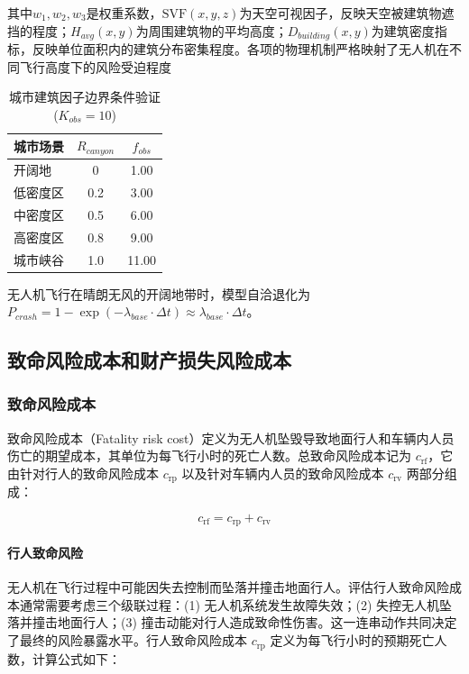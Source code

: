 其中$w_1, w_2, w_3$是权重系数，$\text{SVF}(x,y,z)$为天空可视因子，反映天空被建筑物遮挡的程度；$H_{avg}(x,y)$为周围建筑物的平均高度；$D_{building}(x,y)$为建筑密度指标，反映单位面积内的建筑分布密集程度。各项的物理机制严格映射了无人机在不同飞行高度下的风险受迫程度

\begin{table}[htbp]
\centering
\caption{城市建筑因子边界条件验证($K_{obs}=10$)}
\label{tab:urban_validation}
\renewcommand{\arraystretch}{1.3}
\begin{tabular}{l c c}
\toprule
\textbf{城市场景} & \textbf{$R_{canyon}$} & \textbf{$f_{obs}$} \\
\midrule
开阔地   & 0   & 1.00 \\
低密度区 & 0.2 & 3.00 \\
中密度区 & 0.5 & 6.00 \\
高密度区 & 0.8 & 9.00 \\
城市峡谷 & 1.0 & 11.00 \\
\bottomrule
\end{tabular}
\end{table}

无人机飞行在晴朗无风的开阔地带时，模型自洽退化为$P_{crash} = 1 - \exp(-\lambda_{base} \cdot \Delta t) \approx \lambda_{base} \cdot \Delta t$。

\subsection{致命风险成本和财产损失风险成本}

\subsubsection{致命风险成本}

致命风险成本（Fatality risk cost）定义为无人机坠毁导致地面行人和车辆内人员伤亡的期望成本，其单位为每飞行小时的死亡人数。总致命风险成本记为 $c_{\mathrm{rf}}$，它由针对行人的致命风险成本 $c_{\mathrm{rp}}$ 以及针对车辆内人员的致命风险成本 $c_{\mathrm{rv}}$ 两部分组成：

\begin{equation}
c_{\mathrm{rf}} = c_{\mathrm{rp}} + c_{\mathrm{rv}}
\label{eq:fatality_risk_total}
\end{equation}

\paragraph{行人致命风险}
无人机在飞行过程中可能因失去控制而坠落并撞击地面行人。评估行人致命风险成本通常需要考虑三个级联过程：(1) 无人机系统发生故障失效；(2) 失控无人机坠落并撞击地面行人；(3) 撞击动能对行人造成致命性伤害。这一连串动作共同决定了最终的风险暴露水平。行人致命风险成本 $c_{\mathrm{rp}}$ 定义为每飞行小时的预期死亡人数，计算公式如下：

